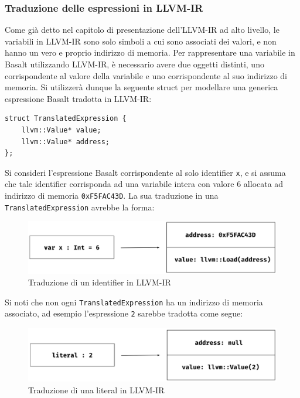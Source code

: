 \subsubsection{Traduzione delle espressioni in LLVM-IR}
Come già detto nel capitolo di presentazione dell'LLVM-IR ad alto livello, le variabili in LLVM-IR sono 
solo simboli a cui sono associati dei valori, e non hanno un vero e proprio indirizzo di memoria. Per rappresentare 
una variabile in Basalt utilizzando LLVM-IR, è necessario avere due oggetti distinti, uno corrispondente al valore 
della variabile e uno corrispondente al suo indirizzo di memoria. Si utilizzerà dunque la seguente struct per modellare 
una generica espressione Basalt tradotta in LLVM-IR:

\vspace{0.5cm}
\begin{lstlisting}[frame=single]
struct TranslatedExpression {
    llvm::Value* value;
    llvm::Value* address;
};
\end{lstlisting}
\vspace{0.5cm}

Si consideri l'espressione Basalt corrispondente al solo identifier \texttt{x}, e si assuma che tale identifier corrisponda 
ad una variabile intera con valore 6 allocata ad indirizzo di memoria \texttt{0xF5FAC43D}. La sua traduzione in una \texttt{TranslatedExpression} 
avrebbe la forma:

\vspace{0.3cm}
\begin{figure}[H]
    \includegraphics[width=\textwidth]{../../Assets/LLVMExpr1}
    \caption{Traduzione di un identifier in LLVM-IR}
\end{figure}
\vspace{0.3cm}

Si noti che non ogni \texttt{TranslatedExpression} ha un indirizzo di memoria associato, ad esempio l'espressione \texttt{2}
sarebbe tradotta come segue: \\

\vspace{0.3cm}
\begin{figure}[H]
    \includegraphics[width=\textwidth]{../../Assets/LLVMExpr2}
    \caption{Traduzione di una literal in LLVM-IR}
\end{figure}
\vspace{0.3cm}

